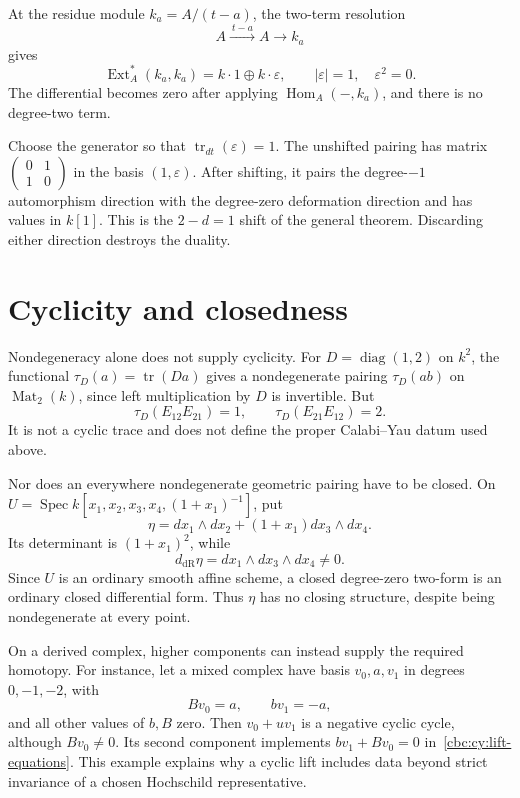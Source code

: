 At the residue module $k_a=A/(t-a)$, the two-term resolution
\[
 A\xrightarrow{\ t-a\ }A\longrightarrow k_a
\]
gives
\[
 \operatorname{Ext}_A^*(k_a,k_a)
       =k\cdot1\oplus k\cdot\varepsilon,
 \qquad |\varepsilon|=1,\quad\varepsilon^2=0.
\]
The differential becomes zero after applying $\operatorname{Hom}_A(-,k_a)$, and there is no degree-two term.

Choose the generator so that $\operatorname{tr}_{dt}(\varepsilon)=1$.
The unshifted pairing has matrix
$\left(\begin{smallmatrix}0&1\\1&0\end{smallmatrix}\right)$ in the basis $(1,\varepsilon)$.
After shifting, it pairs the degree-$-1$ automorphism direction with the degree-zero deformation direction and has values in $k[1]$.
This is the $2-d=1$ shift of the general theorem.
Discarding either direction destroys the duality.

\section{Cyclicity and closedness}

Nondegeneracy alone does not supply cyclicity.
For $D=\operatorname{diag}(1,2)$ on $k^2$, the functional
$\tau_D(a)=\operatorname{tr}(Da)$ gives a nondegenerate pairing $\tau_D(ab)$ on $\operatorname{Mat}_2(k)$, since left multiplication by $D$ is invertible.
But
\[
 \tau_D(E_{12}E_{21})=1,\qquad
 \tau_D(E_{21}E_{12})=2.
\]
It is not a cyclic trace and does not define the proper Calabi--Yau datum used above.

Nor does an everywhere nondegenerate geometric pairing have to be closed.
On
$U=\operatorname{Spec}k[x_1,x_2,x_3,x_4,(1+x_1)^{-1}]$, put
\[
 \eta=dx_1\wedge dx_2+(1+x_1)dx_3\wedge dx_4.
\]
Its determinant is $(1+x_1)^2$, while
\[
 d_{\mathrm{dR}}\eta=dx_1\wedge dx_3\wedge dx_4\ne0.
\]
Since $U$ is an ordinary smooth affine scheme, a closed degree-zero two-form is an ordinary closed differential form.
Thus $\eta$ has no closing structure, despite being nondegenerate at every point.

On a derived complex, higher components can instead supply the required homotopy.
For instance, let a mixed complex have basis $v_0,a,v_1$ in degrees $0,-1,-2$, with
\[
 Bv_0=a,\qquad bv_1=-a,
\]
and all other values of $b,B$ zero.
Then $v_0+uv_1$ is a negative cyclic cycle, although $Bv_0\ne0$.
Its second component implements $bv_1+Bv_0=0$ in~\eqref{cbc:cy:lift-equations}.
This example explains why a cyclic lift includes data beyond strict invariance of a chosen Hochschild representative.

